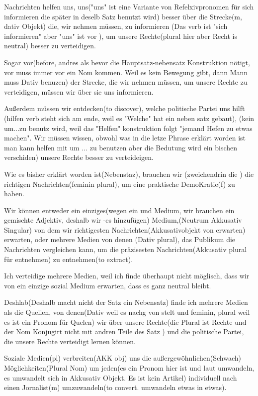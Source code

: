 \documentclass[a4paper]{article}
\begin{document}
        Nachrichten helfen uns, uns("uns" ist eine Variante von Refelxivpronomen für sich informieren die später in deselb Satz benutzt wird) besser über die Strecke(m, dativ Objekt) die, wir nehmen müssen, zu informieren (Das verb ist "sich informieren" aber "uns" ist vor ),  um unsere Rechte(plural hier aber Recht is neutral) besser zu verteidigen.
        
        
        Sogar vor(before, andres als bevor die Hauptsatz-nebensatz Konstruktion nötigt, vor muss immer vor ein Nom kommen. Weil es kein Bewegung gibt, dann Mann muss Dativ benuzen) der Strecke, die wir nehmen müssen, um unsere Rechte zu verteidigen, müssen wir über sie uns informieren.
        
        Außerdem müssen wir entdecken(to discover), welche politische Partei uns hilft (hilfen verb steht sich am ende, weil es "Welche" hat ein neben satz gebaut), (kein um...zu benutz wird, weil das "Helfen" konstruktion folgt "jemand Hefen zu etwas machen". Wir müssen wissen, obwohl was in die letze Phrase erklärt worden ist man kann helfen mit um ... zu benutzen aber die Bedutung wird ein bischen verschiden) unsere Rechte besser zu verteideigen.
        
        Wie es bisher erklärt worden ist(Nebenstaz), brauchen wir (zweichendrin die ) die richtigen Nachrichten(feminin plural), um eine praktische DemoKratie(f) zu haben.
        
        Wir können entweder ein einziges(wegen ein und Medium, wir brauchen ein gemischte Adjektiv, deshalb wir -es hinzufügen) Medium,(Neutrum Akkusativ Singular) von dem wir richtigesten Nachrichten(Akkusativobjekt von erwarten) erwarten, oder mehrere Medien von denen (Dativ plural), das Publikum die Nachrichten vergleichen kann, um die präzisesten Nachrichten(Akkusativ plural für entnehmen) zu entnehmen(to extract).
        
        Ich verteidige mehrere Medien, weil ich finde überhaupt nicht möglisch, dass wir von ein einzige sozial Medium erwarten, dass es ganz neutral bleibt.
        
        Deshlab(Deshalb macht nicht der Satz ein Nebensatz) finde ich mehrere Medien als die Quellen, von denen(Dativ weil es nachg von stelt und feminin, plural weil es ist ein Pronom für Quelen) wir über unsere Rechte(die Plural ist Rechte und der Nom Konjugirt nicht mit andren Teile des Satz ) und die politische Partei, die unsere Rechte verteidigt lernen können.
        
        
        Soziale Medien(pl) verbreiten(AKK obj) uns die außergewöhnlichen(Schwach) Möglichkeiten(Plural Nom) um jeden(es ein Pronom hier ist und laut umwandeln, es umwandelt sich in Akkusativ Objekt. Es ist kein Artikel) individuell nach einen Jornalist(m)  umzuwandeln(to convert. umwandeln etwas in etwas).
        
\end{document}
